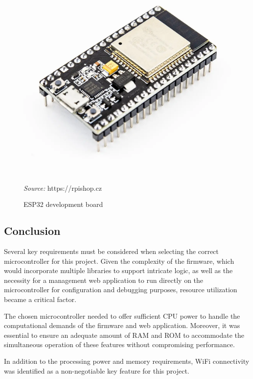 \documentclass[FM,BP,EN,fonts]{tulthesis}
\begin{document}
\begin{figure}[h]
    \centering
    \includegraphics[scale=.2]{media/esp32.png}
    \caption{ESP32 development board}
    \textit{Source:} https://rpishop.cz
    \label{fig:esp32}
\end{figure}

\subsection{Conclusion}

Several key requirements must be considered when selecting the correct microcontroller for this project. Given the complexity of the firmware, which would incorporate multiple libraries to support intricate logic, as well as the necessity for a management web application to run directly on the microcontroller for configuration and debugging purposes, resource utilization became a critical factor. 

The chosen microcontroller needed to offer sufficient CPU power to handle the computational demands of the firmware and web application. Moreover, it was essential to ensure an adequate amount of RAM and ROM to accommodate the simultaneous operation of these features without compromising performance. 

In addition to the processing power and memory requirements, WiFi connectivity was identified as a non-negotiable key feature for this project.
\end{document}
